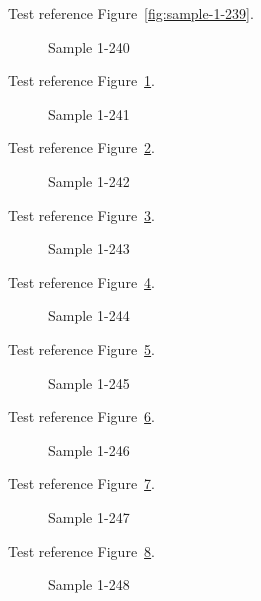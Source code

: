 Test reference Figure~\ref{fig:sample-1-239}.

\begin{figure}[tbhp]
\caption{Sample 1-240}
\label{fig:sample-1-240}
\end{figure}

Test reference Figure~\ref{fig:sample-1-240}.

\begin{figure}[tbhp]
\caption{Sample 1-241}
\label{fig:sample-1-241}
\end{figure}

Test reference Figure~\ref{fig:sample-1-241}.

\begin{figure}[tbhp]
\caption{Sample 1-242}
\label{fig:sample-1-242}
\end{figure}

Test reference Figure~\ref{fig:sample-1-242}.

\begin{figure}[tbhp]
\caption{Sample 1-243}
\label{fig:sample-1-243}
\end{figure}

Test reference Figure~\ref{fig:sample-1-243}.

\begin{figure}[tbhp]
\caption{Sample 1-244}
\label{fig:sample-1-244}
\end{figure}

Test reference Figure~\ref{fig:sample-1-244}.

\begin{figure}[tbhp]
\caption{Sample 1-245}
\label{fig:sample-1-245}
\end{figure}

Test reference Figure~\ref{fig:sample-1-245}.

\begin{figure}[tbhp]
\caption{Sample 1-246}
\label{fig:sample-1-246}
\end{figure}

Test reference Figure~\ref{fig:sample-1-246}.

\begin{figure}[tbhp]
\caption{Sample 1-247}
\label{fig:sample-1-247}
\end{figure}

Test reference Figure~\ref{fig:sample-1-247}.

\begin{figure}[tbhp]
\caption{Sample 1-248}
\label{fig:sample-1-248}
\end{figure}

